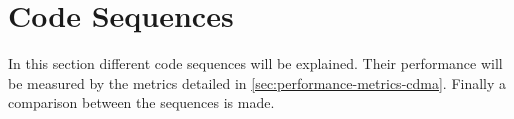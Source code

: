 
\section{Code Sequences}
\label{sec:code-sequences}

In this section different code sequences will be explained.
Their performance will be measured by the metrics detailed in \autoref{sec:performance-metrics-cdma}.
Finally a comparison between the sequences is made.










